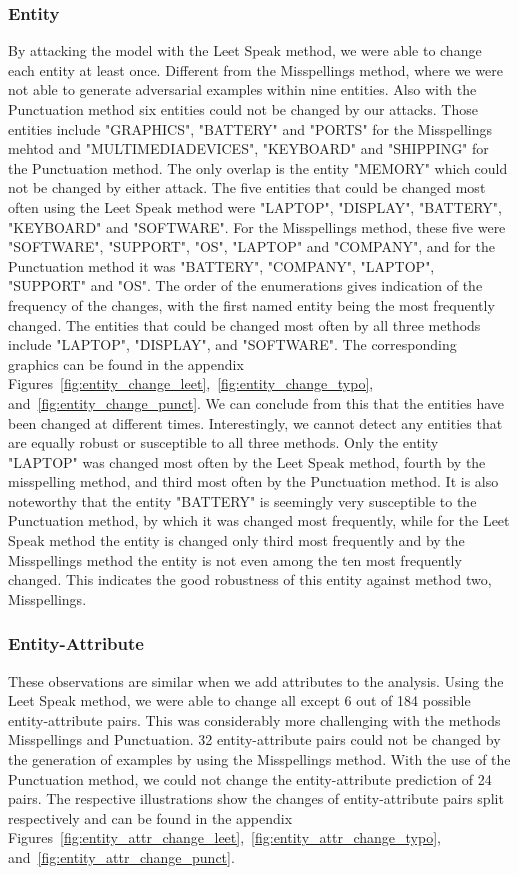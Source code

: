 \subsubsection{Entity}
By attacking the model with the Leet Speak method, we were able to change each entity at least once. Different from the Misspellings method, where we were not able to generate adversarial examples within nine entities. Also with the Punctuation method six entities could not be changed by our attacks. Those entities include "GRAPHICS", "BATTERY" and "PORTS" for the Misspellings mehtod and "MULTIMEDIA\textunderscore DEVICES", "KEYBOARD" and "SHIPPING" for the Punctuation method. The only overlap is the entity "MEMORY" which could not be changed by either attack. 
The five entities that could be changed most often using the Leet Speak method were "LAPTOP", "DISPLAY", "BATTERY", "KEYBOARD" and "SOFTWARE". For the Misspellings method, these five were "SOFTWARE", "SUPPORT", "OS", "LAPTOP" and "COMPANY", and for the Punctuation method it was "BATTERY", "COMPANY", "LAPTOP", "SUPPORT" and "OS". The order of the enumerations gives indication of the frequency of the changes, with the first named entity being the most frequently changed. 
The entities that could be changed most often by all three methods include "LAPTOP", "DISPLAY", and "SOFTWARE". 
The corresponding graphics can be found in the appendix Figures~\ref{fig:entity_change_leet},~\ref{fig:entity_change_typo}, and~\ref{fig:entity_change_punct}. 
We can conclude from this that the entities have been changed at different times.  Interestingly, we cannot detect any entities that are equally robust or susceptible to all three methods. Only the entity "LAPTOP" was changed most often by the Leet Speak method, fourth by the misspelling method, and third most often by the Punctuation method. It is also noteworthy that the entity "BATTERY" is seemingly very susceptible to the Punctuation method, by which it was changed most frequently, while for the Leet Speak method the entity is changed only third most frequently and by the Misspellings method the entity is not even among the ten most frequently changed. This indicates the good robustness of this entity against method two, Misspellings. 

\subsubsection{Entity-Attribute}
These observations are similar when we add attributes to the analysis. Using the Leet Speak method, we were able to change all except 6 out of 184 possible entity-attribute pairs. This was considerably more challenging with the methods Misspellings and Punctuation. 32 entity-attribute pairs could not be changed by the generation of examples by using the Misspellings method. With the use of the Punctuation method, we could not change the entity-attribute prediction of 24 pairs. The respective illustrations show the changes of entity-attribute pairs split respectively and can be found in the appendix Figures~\ref{fig:entity_attr_change_leet},~\ref{fig:entity_attr_change_typo}, and~\ref{fig:entity_attr_change_punct}.

